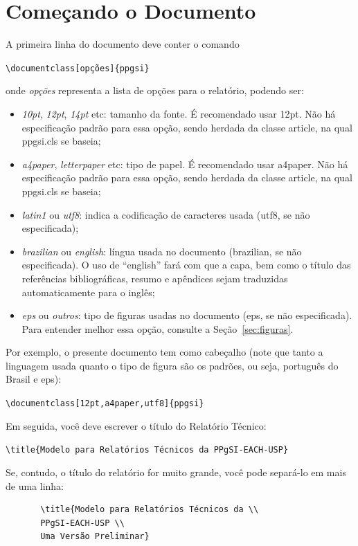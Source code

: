 \documentclass[12pt,a4paper,utf8]{ppgsi}
\begin{document}
\section{Começando o Documento}
\label{sec:comeco}

	A primeira linha do documento deve conter o comando

	\verb|\documentclass[opções]{ppgsi}|

	\noindent onde \textit{opções} representa a lista de opções para o relatório, podendo ser:

	\begin{itemize}
		\item \textit{10pt}, \textit{12pt}, \textit{14pt} etc: tamanho da fonte. É recomendado usar 12pt. Não há especificação padrão para essa opção, sendo herdada da classe article, na qual ppgsi.cls se baseia;
		\item \textit{a4paper}, \textit{letterpaper} etc: tipo de papel. É recomendado usar a4paper. Não há especificação padrão para essa opção, sendo herdada da classe article, na qual ppgsi.cls se baseia;
		\item \textit{latin1} ou \textit{utf8}: indica a codificação de caracteres usada (utf8, se não especificada);
		\item \textit{brazilian} ou \textit{english}: língua usada no documento (brazilian, se não especificada). O uso de ``english'' fará com que a capa, bem como o título das referências bibliográficas, resumo e apêndices sejam traduzidas automaticamente para o inglês;
		\item \textit{eps} ou \textit{outros}: tipo de figuras usadas no documento (eps, se não especificada). Para entender melhor essa opção, consulte a Seção~\ref{sec:figuras}.
	\end{itemize}


	Por exemplo, o presente documento tem como cabeçalho (note que tanto a linguagem usada quanto o tipo de figura são os padrões, ou seja, português do Brasil e eps):

	\verb|\documentclass[12pt,a4paper,utf8]{ppgsi}|

	Em seguida, você deve escrever o título do Relatório Técnico:

	\verb|\title{Modelo para Relatórios Técnicos da PPgSI-EACH-USP}|

	Se, contudo, o título do relatório for muito grande, você pode separá-lo em mais de uma linha:

	\begin{verbatim}
	   \title{Modelo para Relatórios Técnicos da \\
	   PPgSI-EACH-USP \\
	   Uma Versão Preliminar}
	\end{verbatim}
\end{document}
